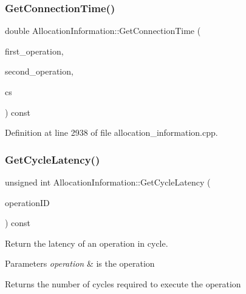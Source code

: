 \subsubsection{\texorpdfstring{Get\+Connection\+Time()}{GetConnectionTime()}\hspace{0.1cm}{\footnotesize\ttfamily [2/2]}}
{\footnotesize\ttfamily double Allocation\+Information\+::\+Get\+Connection\+Time (\begin{DoxyParamCaption}\item[{const \hyperlink{graph_8hpp_abefdcf0544e601805af44eca032cca14}{vertex}}]{first\+\_\+operation,  }\item[{const \hyperlink{graph_8hpp_abefdcf0544e601805af44eca032cca14}{vertex}}]{second\+\_\+operation,  }\item[{const \hyperlink{structAbsControlStep}{Abs\+Control\+Step}}]{cs }\end{DoxyParamCaption}) const}



Definition at line 2938 of file allocation\+\_\+information.\+cpp.

\mbox{\label{classAllocationInformation_a317fc959fa03d6e4c9e66c4091a2bff5}} 
\subsubsection{\texorpdfstring{Get\+Cycle\+Latency()}{GetCycleLatency()}\hspace{0.1cm}{\footnotesize\ttfamily [1/2]}}
{\footnotesize\ttfamily unsigned int Allocation\+Information\+::\+Get\+Cycle\+Latency (\begin{DoxyParamCaption}\item[{const unsigned int}]{operation\+ID }\end{DoxyParamCaption}) const}



Return the latency of an operation in cycle. 


\begin{DoxyParams}{Parameters}
{\em operation} & is the operation \\
\hline
\end{DoxyParams}
\begin{DoxyReturn}{Returns}
the number of cycles required to execute the operation 
\end{DoxyReturn}


